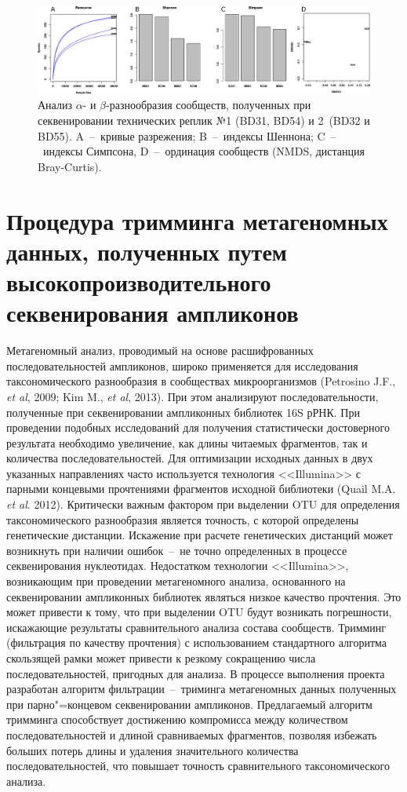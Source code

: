 \documentclass[a4paper,12pt,openany,final]{extreport}
\def\oldcaption{} \let\oldcaption=\caption
\def\caption{\stepcounter{captionsnum}\oldcaption}
\begin{document}
\begin{figure}[h!t]\centering
  \includegraphics[width=0.9\linewidth]{media/image6.png}
  \caption{Анализ \(\alpha\)- и \(\beta\)-разнообразия сообществ, полученных при секвенировании
технических реплик №1 (BD31, BD54) и 2~(BD32 и BD55). A~--~кривые
разрежения; B~--~индексы Шеннона; C~--~индексы Симпсона, D~--~ординация
сообществ (NMDS, дистанция Bray-Curtis).}\label{fig:2}
\end{figure}



\chapter{Процедура тримминга метагеномных данных, полученных путем высокопроизводительного секвенирования ампликонов}\label{chap:2}\label{chap:trim}

Метагеномный анализ, проводимый на основе расшифрованных последовательностей ампликонов, широко применяется для исследования таксономического разнообразия в сообществах микроорганизмов (Petrosino J.F., \textit{et al}, 2009; Kim M., \textit{et al}, 2013). При этом анализируют последовательности, полученные при секвенировании ампликонных библиотек 16S рРНК. При проведении подобных исследований для получения статистически достоверного результата необходимо увеличение, как длины читаемых фрагментов, так и количества последовательностей. Для оптимизации исходных данных в двух указанных направлениях часто используется технология <<Illumina>> с парными концевыми прочтениями фрагментов исходной библиотеки (Quail M.A. \textit{et al}. 2012). Критически важным фактором при выделении OTU для определения таксономического разнообразия является точность, с которой определены генетические дистанции. Искажение при расчете генетических дистанций может возникнуть при наличии ошибок~--~не точно определенных в процессе секвенирования нуклеотидах. Недостатком технологии <<Illumina>>, возникающим при проведении метагеномного анализа, основанного на секвенировании ампликонных библиотек являться низкое качество прочтения. Это может привести к тому, что при выделении OTU будут возникать погрешности, искажающие результаты сравнительного анализа состава сообществ. Тримминг (фильтрация по качеству прочтения) с использованием стандартного алгоритма скользящей рамки может привести к резкому сокращению числа последовательностей, пригодных для анализа. В процессе выполнения проекта разработан алгоритм фильтрации~--~триминга метагеномных данных полученных при парно"=концевом секвенировании ампликонов.  Предлагаемый алгоритм тримминга способствует достижению компромисса между количеством последовательностей и длиной сравниваемых фрагментов, позволяя избежать больших потерь длины и удаления значительного количества последовательностей, что повышает точность сравнительного таксономического анализа.
\end{document}
